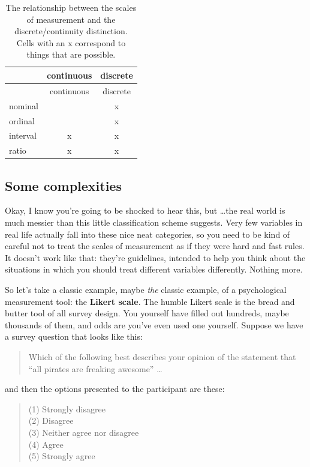 \documentclass[
]{book}
\begin{document}
\begin{longtable}[]{@{}lcc@{}}
\caption{The relationship between the scales of measurement and the discrete/continuity distinction. Cells with an x correspond to things that are possible.}\tabularnewline
\toprule\noalign{}
& continuous & discrete \\
\midrule\noalign{}
\endfirsthead
\toprule\noalign{}
& continuous & discrete \\
\midrule\noalign{}
\endhead
\bottomrule\noalign{}
\endlastfoot
nominal & & x \\
ordinal & & x \\
interval & x & x \\
ratio & x & x \\
\end{longtable}

\subsection{Some complexities}\label{some-complexities}

Okay, I know you're going to be shocked to hear this, but \ldots the real world is much messier than this little classification scheme suggests. Very few variables in real life actually fall into these nice neat categories, so you need to be kind of careful not to treat the scales of measurement as if they were hard and fast rules. It doesn't work like that: they're guidelines, intended to help you think about the situations in which you should treat different variables differently. Nothing more.

So let's take a classic example, maybe {\emph{the}} classic example, of a psychological measurement tool: the \textbf{Likert scale}. The humble Likert scale is the bread and butter tool of all survey design. You yourself have filled out hundreds, maybe thousands of them, and odds are you've even used one yourself. Suppose we have a survey question that looks like this:

\begin{quote}
Which of the following best describes your opinion of the statement that ``all pirates are freaking awesome'' \ldots{}
\end{quote}

and then the options presented to the participant are these:

\begin{quote}
(1) Strongly disagree\\
(2) Disagree\\
(3) Neither agree nor disagree\\
(4) Agree\\
(5) Strongly agree
\end{quote}
\end{document}
